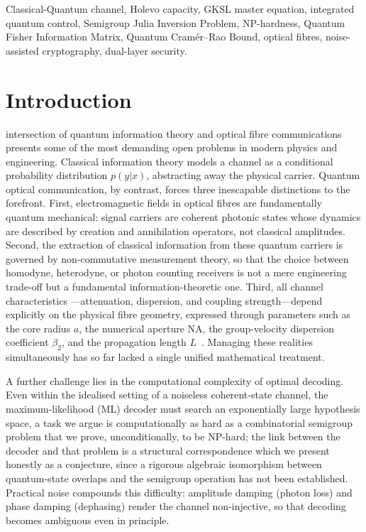 \documentclass[journal,twocolumn]{IEEEtran}
\theoremstyle{definition}
\theoremstyle{plain}
\begin{document}
\begin{IEEEkeywords}
Classical-Quantum channel, Holevo capacity, GKSL master equation,
integrated quantum control, Semigroup Julia Inversion Problem,
NP-hardness, Quantum Fisher Information Matrix, Quantum
Cram\'{e}r--Rao Bound, optical fibres, noise-assisted cryptography,
dual-layer security.
\end{IEEEkeywords}




\section{Introduction}
 intersection of quantum information theory and
optical fibre communications presents some of the most demanding
open problems in modern physics and engineering.  Classical
information theory models a channel as a conditional probability
distribution $p(y|x)$, abstracting away the physical carrier.
Quantum optical communication, by contrast, forces three
inescapable distinctions to the forefront.  First, electromagnetic
fields in optical fibres are fundamentally quantum mechanical:
signal carriers are coherent photonic states whose dynamics are
described by creation and annihilation operators, not classical
amplitudes.  Second, the extraction of classical information from
these quantum carriers is governed by non-commutative measurement
theory, so that the choice between homodyne, heterodyne, or photon counting
receivers is not a mere engineering trade-off but a fundamental
information-theoretic one.  Third, all channel characteristics
---attenuation, dispersion, and coupling strength---depend
explicitly on the physical fibre geometry, expressed through
parameters such as the core radius $a$, the numerical aperture
$\mathrm{NA}$, the group-velocity dispersion coefficient $\beta_2$,
and the propagation length $L$~\cite{snyder1983,agrawal2007}.
Managing these realities simultaneously has so far lacked a
single unified mathematical treatment.

A further challenge lies in the computational complexity of
optimal decoding.  Even within the idealised setting of a noiseless
coherent-state channel, the maximum-likelihood (ML) decoder must
search an exponentially large hypothesis space, a task we argue is
computationally as hard as a combinatorial semigroup problem that we
prove, unconditionally, to be NP-hard; the link between the decoder
and that problem is a structural correspondence which we present
honestly as a conjecture, since a rigorous algebraic isomorphism
between quantum-state overlaps and the semigroup operation has not
been established.  Practical noise compounds this difficulty:
amplitude damping (photon loss) and phase damping (dephasing) render
the channel non-injective, so that decoding becomes ambiguous even
in principle.
\end{document}

